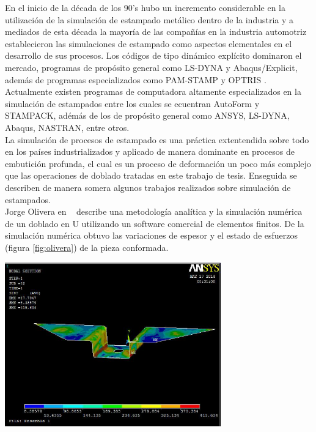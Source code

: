 En el inicio de la década de los 90's hubo un incremento considerable en la utilización de la simulación de estampado 
metálico dentro de la industria y a mediados de esta década la mayoría de las compañías en la industria automotriz 
establecieron las simulaciones de estampado como aspectos elementales en el desarrollo de sus procesos.
Los códigos de tipo dinámico explícito dominaron el mercado, programas de propósito general como LS-DYNA y 
Abaqus/Explicit, además de programas especializados como PAM-STAMP y OPTRIS \cite{banabic2000}.
Actualmente existen programas de computadora altamente especializados en la simulación de estampados entre los 
cuales se ecuentran AutoForm y STAMPACK, adémás de los de propósito general como ANSYS, LS-DYNA, Abaqus, 
NASTRAN, entre otros.\\

La simulación de procesos de estampado es una práctica extentendida sobre todo en los países industrializados y 
aplicado de manera dominante en procesos de embutición profunda, el cual es un proceso de deformación un poco 
más complejo que las operaciones de doblado tratadas en este trabajo de tesis. Enseguida se describen de 
manera somera algunos trabajos realizados sobre simulación de estampados.\\

Jorge Olivera en ~\cite{olivera2014} describe una metodología analítica y la simulación numérica de un doblado en U 
utilizando un software comercial de elementos finitos. De la simulación numérica obtuvo las variaciones de espesor 
y el estado de esfuerzos (figura \ref{fig:olivera}) de la pieza conformada.

\begin{center}
\includegraphics[width=0.7\textwidth]{src/ch1/olivera.png}
\label{fig:olivera}
\end{center}

